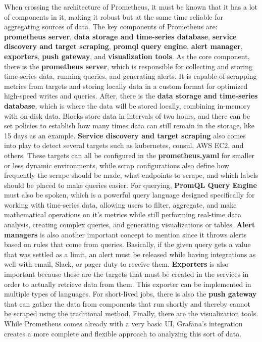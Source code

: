 When crossing the architecture of Prometheus, it must be known that it has a lot of components in it, making it robust but at the same time reliable for aggregating sources of data. The key components of Prometheus are: \textbf{prometheus server}, \textbf{data storage and time-series database}, \textbf{service discovery and target scraping}, \textbf{promql query engine}, \textbf{alert manager}, \textbf{exporters}, \textbf{push gateway}, and \textbf{visualization tools}. As the core component, there is the \textbf{prometheus server}, which is responsible for collecting and storing time-series data, running queries, and generating alerts. It is capable of scrapping metrics from targets and storing locally data in a custom format for optimized high-speed writes and queries. After, there is the \textbf{data storage and time-series database}, which is where the data will be stored locally, combining in-memory with on-disk data. Blocks store data in intervals of two hours, and there can be set policies to establish how many times data can still remain in the storage, like 15 days as an example. \textbf{Service discovery and target scraping} also comes into play to detect several targets such as kubernetes, consul, AWS EC2, and others. These targets can all be configured in the \textbf{prometheus.yaml} for smaller or less dynamic environments, while scrap configurations also define how frequently the scrape should be made, what endpoints to scrape, and which labels should be placed to make queries easier. For querying, \textbf{PromQL Query Engine} must also be spoken, which is a powerful query language designed specifically for working with time-series data, allowing users to filter, aggregate, and make mathematical operations on it's metrics while still performing real-time data analysis, creating complex queries, and generating visualizations or tables. \textbf{Alert managers} is also another important concept to mention since it throws alerts based on rules that come from queries. Basically, if the given query gets a value that was settled as a limit, an alert must be released while having integrations as well with email, Slack, or pager duty to receive them. \textbf{Exporters} is also important because these are the targets that must be created in the services in order to actually retrieve data from them. This exporter can be implemented in multiple types of languages. For short-lived jobs, there is also the \textbf{push gateway} that can gather the data from components that run shortly and thereby cannot be scraped using the traditional method. Finally, there are the visualization tools. While Prometheus comes already with a very basic UI, Grafana's integration creates a more complete and flexible approach to analyzing this sort of data.



